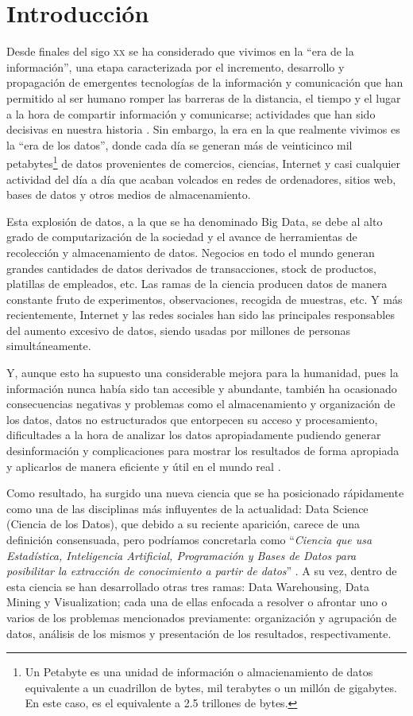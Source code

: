 \documentclass[10pt, a4paper]{article}
\begin{document}
\section{Introducción}

Desde finales del sigo \textsc{xx} se ha considerado que vivimos en la ``era de la información'', una etapa caracterizada por el incremento, desarrollo y propagación de emergentes tecnologías de la información y comunicación que han permitido al ser humano romper las barreras de la distancia, el tiempo y el lugar a la hora de compartir información y comunicarse; actividades que han sido decisivas en nuestra historia \cite{INTRODUCCION}. Sin embargo, la era en la que realmente vivimos es la ``era de los datos'', donde cada día se generan más de veinticinco mil petabytes\footnote {Un Petabyte es una unidad de información o almacienamiento de datos equivalente a un cuadrillon de bytes, mil terabytes o un millón de gigabytes. En este caso, es el equivalente a 2.5 trillones de bytes.} de datos provenientes de comercios, ciencias, Internet y casi cualquier actividad del día a día \cite{DATA NEVER SLEEP} que acaban volcados en redes de ordenadores, sitios web, bases de datos y otros medios de almacenamiento. 

Esta explosión de datos, a la que se ha denominado Big Data, se debe al alto grado de computarización de la sociedad y el avance de herramientas de recolección y almacenamiento de datos. Negocios en todo el mundo generan grandes cantidades de datos derivados de transacciones, stock de productos,  platillas de empleados, etc. Las ramas de la ciencia producen datos de manera constante fruto de experimentos, observaciones, recogida de muestras, etc. Y más recientemente, Internet y las redes sociales han sido las principales responsables del aumento excesivo de datos, siendo usadas por millones de personas simultáneamente.

Y, aunque esto ha supuesto una considerable mejora para la humanidad, pues la información nunca había sido tan accesible y abundante, también ha ocasionado consecuencias negativas y problemas como el almacenamiento y organización de los datos, datos no estructurados que entorpecen su acceso y procesamiento, dificultades a la hora de analizar los datos apropiadamente pudiendo generar desinformación y complicaciones para mostrar los resultados de forma apropiada y aplicarlos de manera eficiente y útil en el mundo real \cite{3}.

Como resultado, ha surgido una nueva ciencia que se ha posicionado rápidamente como una de las disciplinas más influyentes de la actualidad: Data Science (Ciencia de los Datos), que debido a su reciente aparición, carece de una definición consensuada, pero podríamos concretarla como ``\textit{Ciencia que usa Estadística, Inteligencia Artificial, Programación y Bases de Datos para posibilitar la extracción de conocimiento a partir de datos}'' \cite{4}. A su vez, dentro de esta ciencia se han desarrollado otras tres ramas: Data Warehousing, Data Mining y Visualization; cada una de ellas enfocada a resolver o afrontar uno o varios de los problemas mencionados previamente: organización y agrupación de datos, análisis de los mismos y presentación de los resultados, respectivamente.
\end{document}
